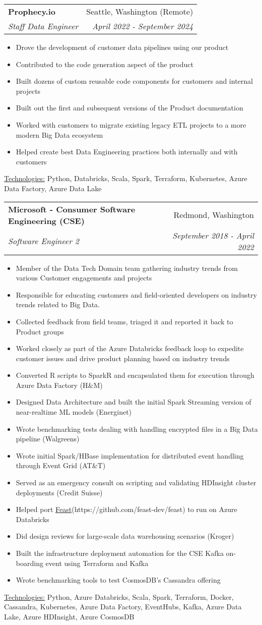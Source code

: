 \documentclass[letterpaper,11pt]{article}
\makeatletter
\newcommand{\sepsection}{\vspace{25pt}}
\newcommand{\resumeItem}[1]{%
  \item\small{
    #1
  }
}
\newcommand{\resumeSubheading}[4]{
  \vspace{8pt}\item%
    \begin{tabular*}{0.97\textwidth}[t]{l@{\extracolsep{\fill}}r}
      \textbf{#1} & #2 \\
      \textit{\small#3} & \textit{\small #4} \\
    \end{tabular*}\vspace{-5pt}
}
\newcommand{\resumeItemListStart}{\begin{itemize}}
\newcommand{\resumeItemListEnd}{\end{itemize}\vspace{-5pt}}
\newcommand{\resumeTech}[2]{
 \underline{#1:} #2
}
\makeatother
\begin{document}
    \sepsection

    \resumeSubheading
      {Prophecy.io}{Seattle, Washington (Remote)}
      {Staff Data Engineer}{April 2022 - September 2024}
      \resumeItemListStart
      \resumeItem{Drove the development of customer data pipelines using our product}
      \resumeItem{Contributed to the code generation aspect of the product}
      \resumeItem{Built dozens of custom reusable code components for customers and internal projects}
      \resumeItem{Built out the first and subsequent versions of the Product documentation}
      \resumeItem{Worked with customers to migrate existing legacy ETL projects to a more modern Big Data ecosystem}
      \resumeItem{Helped create best Data Engineering practices both internally and with customers}
      \resumeItemListEnd
      \resumeTech{Technologies}{Python, Databricks, Scala, Spark, Terraform, Kubernetes, Azure Data Factory, Azure Data Lake}\\
    
    \sepsection

    \resumeSubheading
      {Microsoft - Consumer Software Engineering (CSE)}{Redmond, Washington}
      {Software Engineer 2}{September 2018 - April 2022}
      \resumeItemListStart
      \resumeItem{Member of the Data Tech Domain team gathering industry trends from various Customer engagements and projects}
      \resumeItem{Responsible for educating customers and field-oriented developers on industry trends related to Big Data.}
      \resumeItem{Collected feedback from field teams, triaged it and reported it back to Product groups}
      \resumeItem{Worked closely as part of the Azure Databricks feedback loop to expedite customer issues and drive product planning based on industry trends}
      \resumeItem{Converted R scripts to SparkR and encapsulated them for execution through Azure Data Factory (H\&M)}
      \resumeItem{Designed Data Architecture and built the initial Spark Streaming version of near-realtime ML models (Energinet)}
      \resumeItem{Wrote benchmarking tests dealing with handling encrypted files in a Big Data pipeline (Walgreens)}
      \resumeItem{Wrote initial Spark/HBase implementation for distributed event handling through Event Grid (AT\&T)}
      \resumeItem{Served as an emergency consult on scripting and validating HDInsight cluster deployments (Credit Suisse)}
      \resumeItem{Helped port \href{https://github.com/feast-dev/feast}{Feast}(https://github.com/feast-dev/feast) to run on Azure Databricks}
      \resumeItem{Did design reviews for large-scale data warehousing scenarios (Kroger)}
      \resumeItem{Built the infrastructure deployment automation for the CSE Kafka on-boarding event using Terraform and Kafka}
      \resumeItem{Wrote benchmarking tools to test CosmosDB's Cassandra offering}
      \resumeItemListEnd
      \resumeTech{Technologies}{Python, Azure Databricks, Scala, Spark, Terraform, Docker, Cassandra, Kubernetes, Azure Data Factory, EventHubs, Kafka, Azure Data Lake, Azure HDInsight, Azure CosmosDB}\\
      
\end{document}

